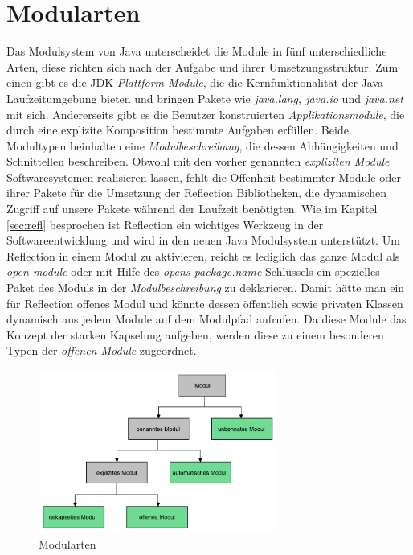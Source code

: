   \section{Modularten} \label{Modularten}
    Das Modulsystem von Java unterscheidet die Module in fünf unterschiedliche Arten, diese richten sich nach der Aufgabe und ihrer Umsetzungsstruktur. Zum einen gibt es die JDK \textit{Plattform Module}, die die Kernfunktionalität der Java Laufzeitumgebung bieten und bringen Pakete wie \textit{java.lang, java.io} und \textit{java.net} mit sich. Andererseits gibt es die Benutzer konstruierten \textit{Applikationsmodule}, die durch eine explizite Komposition bestimmte Aufgaben erfüllen. Beide Modultypen beinhalten eine \textit{Modulbeschreibung}, die dessen Abhängigkeiten und Schnittellen beschreiben. \newline
    Obwohl mit den vorher genannten \textit{expliziten Module} Softwaresystemen realisieren lassen, fehlt die Offenheit bestimmter Module oder ihrer Pakete für die Umsetzung der Reflection Bibliotheken, die dynamischen Zugriff auf unsere Pakete während der Laufzeit benötigten. Wie im Kapitel \ref{sec:refl} besprochen ist Reflection ein wichtiges Werkzeug in der Softwareentwicklung und wird in den neuen Java Modulsystem unterstützt. Um Reflection in einem Modul zu aktivieren, reicht es lediglich das ganze Modul als \textit{open module} oder mit Hilfe des \textit{opens package.name} Schlüssels ein spezielles Paket des Moduls in der \textit{Modulbeschreibung} zu deklarieren. Damit hätte man ein für Reflection offenes Modul und könnte dessen öffentlich sowie privaten Klassen dynamisch aus jedem Module auf dem Modulpfad aufrufen. Da diese Module das Konzept der starken Kapselung aufgeben, werden diese zu einem besonderen Typen der \textit{offenen Module} zugeordnet. \cite{modulMitJava9,java9modRevealed,modulProgJava9,explorJava9}

    \begin{figure}[h]
      \centering
      \includegraphics[width=0.7\textwidth]{material/images/module-tree.pdf}
      \caption{Modularten \cite{modulMitJava9}}
      \label{fig:modtree}
    \end{figure}

